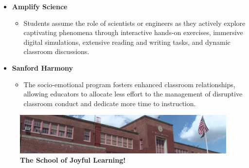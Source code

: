\documentclass[11pt, letterpaper]{article}
\begin{document}
\begin{itemize}
\begin{itemize}
\end{itemize}
\item \textbf{Amplify Science}
	\begin{itemize}
	\item Students assume the role of scientists or engineers as they actively explore captivating phenomena through interactive hands-on exercises, immersive digital simulations, extensive reading and writing tasks, and dynamic classroom discussions.
	\end{itemize}
\item \textbf{Sanford Harmony}
	\begin{itemize}
	\item The socio-emotional program fosters enhanced classroom relationships, allowing educators to allocate less effort to the management of disruptive classroom conduct and dedicate more time to instruction.
	\end{itemize}
\end{itemize}

\begin{figure}[H]
  \centering
\includegraphics[width=1\linewidth]{1.png}
\caption{\textbf{The School of Joyful Learning!}}
  \label{fig:PS192}
\end{figure}
\end{document}
